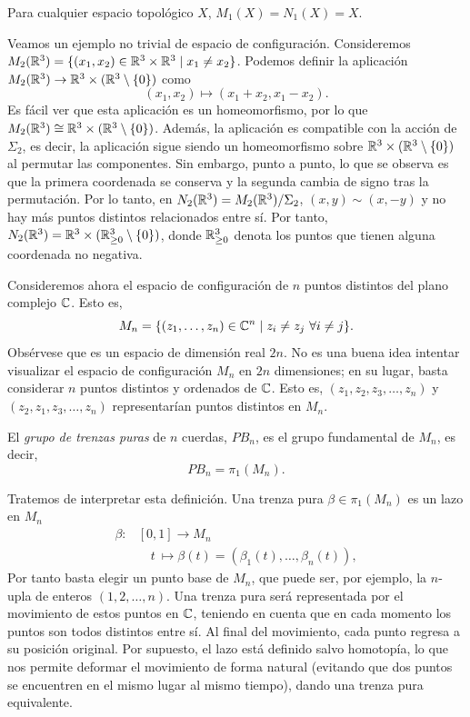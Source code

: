 \documentclass[TFG.tex]{subfiles}
\begin{document}
\begin{observacion}
Para cualquier espacio topológico $X$, $M_1(X)=N_1(X)=X$.
\end{observacion}

\begin{ej}
Veamos un ejemplo no trivial de espacio de configuración. Consideremos $M_2(\mathbb{R}^3)=\{(x_1,x_2)\in\mathbb{R}^3\times\mathbb{R}^3\mid x_1\neq x_2\}$. Podemos definir la aplicación $M_2(\mathbb{R}^3)\to \mathbb{R}^3\times(\mathbb{R}^3\setminus\{0\})$ como
\[
(x_1,x_2)\mapsto (x_1+x_2,x_1-x_2).
\]
Es fácil ver que esta aplicación es un homeomorfismo, por lo que $M_2(\mathbb{R}^3)\cong \mathbb{R}^3\times(\mathbb{R}^3\setminus\{0\})$. Además, la aplicación es compatible con la acción de $\Sigma_2$, es decir, la aplicación sigue siendo un homeomorfismo sobre $\mathbb{R}^3\times(\mathbb{R}^3\setminus\{0\})$ al permutar las componentes. Sin embargo, punto a punto, lo que se observa es que la primera coordenada se conserva y la segunda cambia de signo tras la permutación. Por lo tanto, en $N_2(\mathbb{R}^3)=M_2(\mathbb{R}^3)/\Sigma_2$, $(x,y)\sim (x,-y)$ y no hay más puntos distintos relacionados entre sí. Por tanto, $N_2(\mathbb{R}^3)=\mathbb{R}^3\times(\mathbb{R}^3_{\geq 0}\setminus\{0\})$, donde $\mathbb{R}^3_{\geq 0}$ denota los puntos que tienen alguna coordenada no negativa.

\end{ej}


Consideremos ahora el espacio de configuración de $n$ puntos distintos del plano complejo $\mathbb{C}$. Esto es,
$$M_n=\{(z_1,\dots,z_n)\in\C^n\mid z_i\neq z_j\ \forall i\neq j\}.$$ 
Obsérvese que es un espacio de dimensión real $2n$. No es una buena idea intentar visualizar el espacio de configuración $M_n$ en $2n$ dimensiones; en su lugar, basta considerar $n$ puntos distintos y ordenados de $\mathbb{C}$. Esto es, $(z_1,z_2,z_3,\dots, z_n)$ y $(z_2,z_1,z_3,\dots, z_n)$ representarían puntos distintos en $M_n$. 
\begin{defi}
El \emph{grupo de trenzas puras} de $n$ cuerdas, $PB_n$, es el grupo fundamental de $M_n$, es decir,
$$PB_n=\pi_1(M_n).$$
\end{defi}

Tratemos de interpretar esta definición. Una trenza pura $\beta\in\pi_1(M_n)$ es un lazo en $M_n$
\begin{align*}
\beta: & [0,1]\to M_n\\
& \quad t\ \mapsto \beta(t)= (\beta_1(t),\dots, \beta_n(t)),
\end{align*}
Por tanto basta elegir un punto base de $M_n$, que puede ser, por ejemplo, la $n$-upla de enteros $(1,2,\dots, n)$. Una trenza pura será representada por el movimiento de estos puntos en $\mathbb{C}$, teniendo en cuenta que en cada momento los puntos son todos distintos entre sí. Al final del movimiento, cada punto regresa a su posición original. Por supuesto, el lazo está definido salvo homotopía, lo que nos permite deformar el movimiento de forma natural (evitando que dos puntos se encuentren en el mismo lugar al mismo tiempo), dando una trenza pura equivalente.
\end{document}
